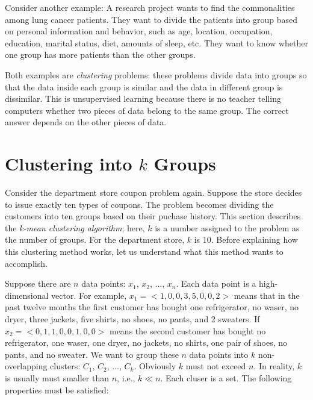 Consider another example: A research project wants to find the
commonalities among lung cancer patients. They want to divide the
patients into group based on personal information and behavior, such
as age, location, occupation, education, marital status, diet, amounts
of sleep, etc. They want to know whether one group has more patients
than the other groups.

Both examples are {\it clustering} problems: these problems divide
data into groups so that the data inside each group is similar and the
data in different group is dissimilar.  This is unsupervised learning
because there is no teacher telling computers whether two pieces of
data belong to the same group.  The correct answer depends on the
other pieces of data.  

\section{Clustering into $k$ Groups}

Consider the department store coupon problem again. Suppose the store
decides to issue exactly ten types of coupons.  The problem becomes
dividing the customers into ten groups based on their puchase history.
This section describes the {\it k-mean clustering algorithm}; here,
$k$  is a number assigned to
the problem as the number of groups.  For the department store, $k$ is
10.  Before explaining how this clustering method works, let us
understand what this method wants to accomplish.

Suppose there are $n$ data points: $x_1$, $x_2$, ..., $x_n$. Each data
point is a high-dimensional vector.  For example, $x_1 = <1, 0, 0, 3,
5, 0, 0, 2>$ means that in the past twelve months the first customer
has bought one refrigerator, no waser, no dryer, three jackets, five
shirts, no shoes, no pants, and 2 sweaters.  If $x_2 = <0, 1, 1, 0, 0,
1, 0, 0>$ means the second customer has bought no refrigerator, one
waser, one dryer, no jackets, no shirts, one pair of shoes, no pants,
and no sweater.  We want to group these $n$ data points into $k$
non-overlapping clusters: $C_1$, $C_2$, ..., $C_k$. Obviously $k$ must
not exceed $n$. In reality, $k$ is usually must smaller than $n$,
i.e., $k \ll n$.  Each cluser is a set.   The following properties must be
satisfied:


